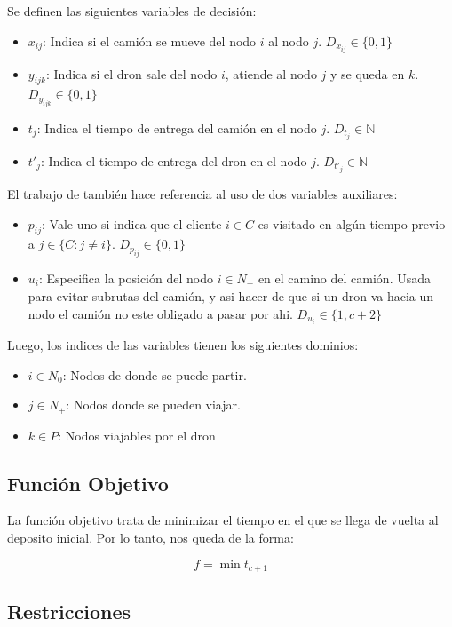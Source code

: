 Se definen las siguientes variables de decisión:

\begin{itemize}
\item $x_{ij}$: Indica si el camión se mueve del nodo $i$ al nodo $j$. $D_{x_{ij}} \in \{0,1\}$
\item $y_{ijk}$: Indica si el dron sale del nodo $i$, atiende al nodo $j$ y se queda en $k$. $D_{y_{ijk}} \in \{0,1\}$
\item $t_j$: Indica el tiempo de entrega del camión en el nodo $j$. $D_{t_j} \in \mathbb{N}$
\item $t'_j$: Indica el tiempo de entrega del dron en el nodo $j$. $D_{t'_j} \in \mathbb{N}$
\end{itemize}

El trabajo de \cite{Murray2015Flying} también hace referencia al uso de dos variables auxiliares:
\begin{itemize}
\item $p_{ij}$: Vale uno si indica que el cliente $i \in C$ es visitado en algún tiempo previo a $j\in\{C: j\neq i\}$. $D_{p_{ij}} \in \{0,1\}$
\item $u_i$: Especifica la posición del nodo $i \in N_+$ en el camino del camión. Usada para evitar subrutas del camión, y asi hacer de que si un dron va hacia un nodo el camión no este obligado a pasar por ahi. $D_{u_i} \in \{1,c+2\}$
\end{itemize}

Luego, los indices de las variables tienen los siguientes dominios:
\begin{itemize}
\item $i \in N_0$: Nodos de donde se puede partir.
\item $j \in N_+$: Nodos donde se pueden viajar.
\item $k \in P$: Nodos viajables por el dron
\end{itemize}

\subsection{Función Objetivo}

La función objetivo trata de minimizar el tiempo en el que se llega de vuelta al deposito inicial. Por lo tanto, nos queda de la forma:

\begin{equation}
f = \min t_{c+1} \tag{1}
\end{equation}

\subsection{Restricciones}

